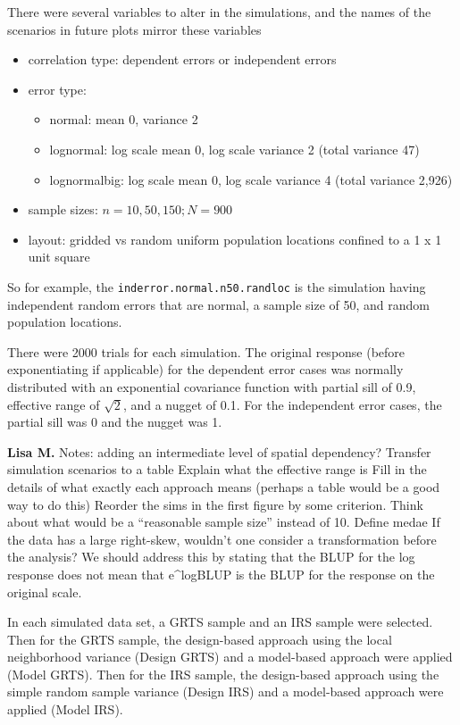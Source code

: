 \documentclass[]{elsarticle} %
\providecommand{\tightlist}{%
  \setlength{\itemsep}{0pt}\setlength{\parskip}{0pt}}
\begin{document}
There were several variables to alter in the simulations, and the names
of the scenarios in future plots mirror these variables

\begin{itemize}
\tightlist
\item
  correlation type: dependent errors or independent errors
\item
  error type:

  \begin{itemize}
  \tightlist
  \item
    normal: mean 0, variance 2
  \item
    lognormal: log scale mean 0, log scale variance 2 (total variance
    47)
  \item
    lognormalbig: log scale mean 0, log scale variance 4 (total variance
    2,926)
  \end{itemize}
\item
  sample sizes: \(n = 10, 50, 150; N = 900\)
\item
  layout: gridded vs random uniform population locations confined to a 1
  x 1 unit square
\end{itemize}

So for example, the \texttt{inderror.normal.n50.randloc} is the
simulation having independent random errors that are normal, a sample
size of 50, and random population locations.

There were 2000 trials for each simulation. The original response
(before exponentiating if applicable) for the dependent error cases was
normally distributed with an exponential covariance function with
partial sill of 0.9, effective range of \(\sqrt{2}\), and a nugget of
0.1. For the independent error cases, the partial sill was 0 and the
nugget was 1.

\textbf{Lisa M.} Notes: adding an intermediate level of spatial
dependency? Transfer simulation scenarios to a table Explain what the
effective range is Fill in the details of what exactly each approach
means (perhaps a table would be a good way to do this) Reorder the sims
in the first figure by some criterion. Think about what would be a
``reasonable sample size'' instead of 10. Define medae If the data has a
large right-skew, wouldn't one consider a transformation before the
analysis? We should address this by stating that the BLUP for the log
response does not mean that e\^{}logBLUP is the BLUP for the response on
the original scale.

In each simulated data set, a GRTS sample and an IRS sample were
selected. Then for the GRTS sample, the design-based approach using the
local neighborhood variance (Design GRTS) and a model-based approach
were applied (Model GRTS). Then for the IRS sample, the design-based
approach using the simple random sample variance (Design IRS) and a
model-based approach were applied (Model IRS).
\end{document}

